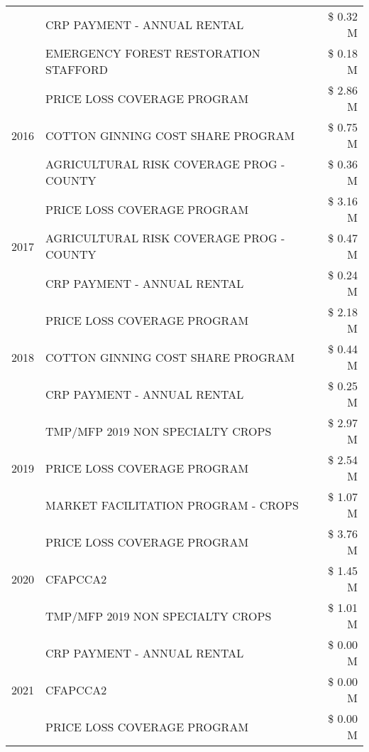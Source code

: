 \begin{tabular}{llr}
 & CRP PAYMENT - ANNUAL RENTAL & \$ 0.32 M \\
 & EMERGENCY FOREST RESTORATION STAFFORD & \$ 0.18 M \\
\cline{1-3}
\multirow[t]{3}{*}{2016} & PRICE LOSS COVERAGE PROGRAM                   & \$ 2.86 M \\
 & COTTON GINNING COST SHARE PROGRAM             & \$ 0.75 M \\
 & AGRICULTURAL RISK COVERAGE PROG - COUNTY      & \$ 0.36 M \\
\cline{1-3}
\multirow[t]{3}{*}{2017} & PRICE LOSS COVERAGE PROGRAM & \$ 3.16 M \\
 & AGRICULTURAL RISK COVERAGE PROG - COUNTY & \$ 0.47 M \\
 & CRP PAYMENT - ANNUAL RENTAL & \$ 0.24 M \\
\cline{1-3}
\multirow[t]{3}{*}{2018} & PRICE LOSS COVERAGE PROGRAM & \$ 2.18 M \\
 & COTTON GINNING COST SHARE PROGRAM & \$ 0.44 M \\
 & CRP PAYMENT - ANNUAL RENTAL & \$ 0.25 M \\
\cline{1-3}
\multirow[t]{3}{*}{2019} & TMP/MFP 2019 NON SPECIALTY CROPS & \$ 2.97 M \\
 & PRICE LOSS COVERAGE PROGRAM & \$ 2.54 M \\
 & MARKET FACILITATION PROGRAM - CROPS & \$ 1.07 M \\
\cline{1-3}
\multirow[t]{3}{*}{2020} & PRICE LOSS COVERAGE PROGRAM & \$ 3.76 M \\
 & CFAPCCA2 & \$ 1.45 M \\
 & TMP/MFP 2019 NON SPECIALTY CROPS & \$ 1.01 M \\
\cline{1-3}
\multirow[t]{3}{*}{2021} & CRP PAYMENT - ANNUAL RENTAL & \$ 0.00 M \\
 & CFAPCCA2 & \$ 0.00 M \\
 & PRICE LOSS COVERAGE PROGRAM & \$ 0.00 M \\
\cline{1-3}
\bottomrule
\end{tabular}
